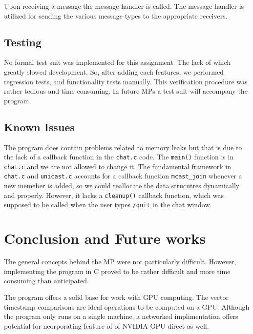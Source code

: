 \documentclass[11pt]{report}
\begin{document}
Upon receiving a message the message handler is called.  The message handler is utilized for sending the various message types to the appropriate receivers.


\section{Testing}

No formal test suit was implemented for this assignment.  The lack of which greatly slowed development.  So, after adding each features, we performed regression tests, and functionality tests manually. This verification procedure was rather tedious and time consuming.  In future MPs a test suit will accompany the program.  


\section{ Known Issues}
The program does contain problems related to memory leaks but that is due to the lack of a callback function in the \verb+chat.c+ code. The \verb+main()+ function is in \verb+chat.c+ and we are not allowed to change it. The fundamental framework in \verb+chat.c+ and \verb+unicast.c+ accounts for a callback function \verb+mcast_join+ whenever a new memeber is added, so we could reallocate the data strucutres dynamically and properly. However, it lacks a \verb+cleanup()+ callback function, which was supposed to be called when the user types \verb+/quit+ in the chat window. 

\chapter{Conclusion and Future works}
	The general concepts behind the MP were not particularly difficult.  However, implementing the program in C proved to be rather difficult and more time consuming than anticipated.  


The program oﬀers a solid base for work with GPU computing. The vector timestamp
comparisons are ideal operations to be computed on a GPU. Although the program only
runs on a single machine, a networked implimentation oﬀers potential for ncorporating
feature of of NVIDIA GPU direct as well.



\end{document}
